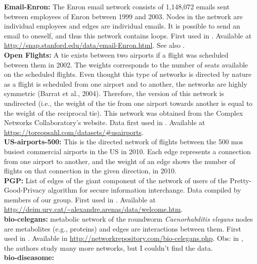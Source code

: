 \documentclass{article}
\begin{document}
\textbf{Email-Enron:} The Enron email network consists of 1,148,072 emails sent between employees of Enron between 1999 and 2003. Nodes in the network are individual employees and edges are individual emails. It is possible to send an email to oneself, and thus this network contains loops. First used in \cite{leskovec2009}. Available at \url{http://snap.stanford.edu/data/email-Enron.html}. See also \cite{konect:2017:enron,konect:klimt04}.
\\

\textbf{Open Flights:} A tie exists between two airports if a flight was scheduled between them in 2002. The weights corresponds to the number of seats available on the scheduled flights. Even thought this type of networks is directed by nature as a flight is scheduled from one airport and to another, the networks are highly symmetric (Barrat et al., 2004). Therefore, the version of this network is undirected (i.e., the weight of the tie from one airport towards another is equal to the weight of the reciprocal tie). This network was obtained from the Complex Networks Collaboratory’s website. Data first used in \cite{Colizza2007Reaction-diffusionNetworks}. Available at \url{https://toreopsahl.com/datasets/#usairports}.
\\

\textbf{US-airports-500:} This is the directed network of flights between the 500 mos busiest commercial airports in the US in 2010. Each edge represents a connection from one airport to another, and the weight of an edge shows the number of flights on that connection in the given direction, in 2010.
\\

\textbf{PGP:} List of edges of the giant component of the network of users of the Pretty-Good-Privacy algorithm for secure information interchange. Data compiled by members of our group. First used in \cite{Boguna2004ModelsAttachment}. Available at \url{http://deim.urv.cat/~alexandre.arenas/data/welcome.htm}.
\\


\textbf{bio-celegans:} metabolic network of the roundworm \emph{Caenorhabditis elegans} nodes are metabolites (e.g., proteins) and edges are interactions between them. First used in \cite{Jeong2000TheNetworks}. Available in \url{http://networkrepository.com/bio-celegans.php}. Obs: in  \cite{Jeong2000TheNetworks}, the authors study many more networks, but I couldn't find the data.
\\

\textbf{bio-diseasome:} 
\\
\end{document}
